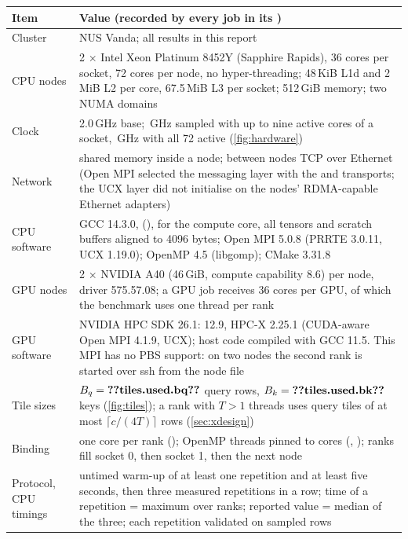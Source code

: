 \begin{table}[!ht]
\centering\small
\begin{tabularx}{\textwidth}{@{}l Y@{}}
\toprule
Item & Value (recorded by every job in its )\\
\midrule
Cluster & NUS Vanda; all results in this report\\
CPU nodes & 2 $\times$ Intel Xeon Platinum 8452Y (Sapphire Rapids), 36 cores per socket, 72 cores per node, no hyper-threading; 48\,KiB L1d and 2\,MiB L2 per core, 67.5\,MiB L3 per socket; 512\,GiB memory; two NUMA domains\\
Clock & 2.0\,GHz base; \,GHz sampled with up to nine active cores of a socket, \,GHz with all 72 active (\cref{fig:hardware})\\
Network & shared memory inside a node; between nodes TCP over Ethernet (Open MPI selected the  messaging layer with the  and  transports; the UCX layer did not initialise on the nodes' RDMA-capable Ethernet adapters)\\
CPU software & GCC 14.3.0,  (),  for the compute core, all tensors and scratch buffers aligned to 4096 bytes; Open MPI 5.0.8 (PRRTE 3.0.11, UCX 1.19.0); OpenMP 4.5 (libgomp); CMake 3.31.8\\
GPU nodes & 2 $\times$ NVIDIA A40 (46\,GiB, compute capability 8.6) per node, driver 575.57.08; a GPU job receives 36 cores per GPU, of which the benchmark uses one thread per rank\\
GPU software & NVIDIA HPC SDK 26.1:  12.9, HPC-X 2.25.1 (CUDA-aware Open MPI 4.1.9, UCX); host code compiled with GCC 11.5. This MPI has no PBS support: on two nodes the second rank is started over ssh from the node file\\
Tile sizes & $B_q=\n{tiles.used.bq}$ query rows, $B_k=\n{tiles.used.bk}$ keys (\cref{fig:tiles}); a rank with $T>1$ threads uses query tiles of at most $\lceil c/(4T)\rceil$ rows (\cref{sec:xdesign})\\
Binding & one core per rank (); OpenMP threads pinned to cores (, ); ranks fill socket 0, then socket 1, then the next node\\
Protocol, CPU timings & untimed warm-up of at least one repetition and at least five seconds, then three measured repetitions in a row; time of a repetition = maximum over ranks; reported value = median of the three; each repetition validated on sampled rows\\

\end{tabularx}
\end{table}

